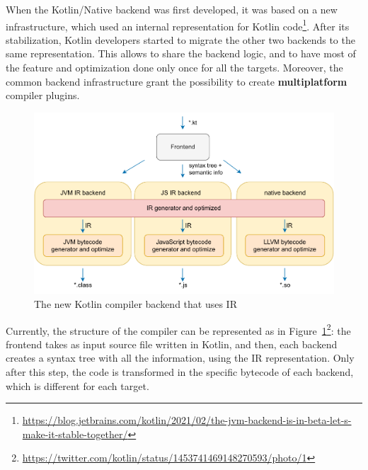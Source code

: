 When the Kotlin/Native backend was first developed, it was based on a new infrastructure, which used an internal representation for Kotlin code\footnote{\url{https://blog.jetbrains.com/kotlin/2021/02/the-jvm-backend-is-in-beta-let-s-make-it-stable-together/}}. After its stabilization, Kotlin developers started to migrate the other two backends to the same representation. This allows to share the backend logic, and to have most of the feature and optimization done only once for all the targets. Moreover, the common backend infrastructure grant the possibility to create \textbf{multiplatform} compiler plugins.

\begin{figure}[!ht]
    \centering
    \includegraphics[scale=0.9]{document/chapters/2-metaprogramming/images/kotlin_compiler_plugin_ir_representation.pdf}
    \caption{The new Kotlin compiler backend that uses IR}
    \label{fig:kotlin_compiler_plugin_ir_representation}
\end{figure}

Currently, the structure of the compiler can be represented as in Figure~\ref{fig:kotlin_compiler_plugin_ir_representation}\footnote{\url{https://twitter.com/kotlin/status/1453741469148270593/photo/1}}: the frontend takes as input source file written in Kotlin, and then, each backend creates a syntax tree with all the information, using the IR representation. Only after this step, the code is transformed in the specific bytecode of each backend, which is different for each target.

